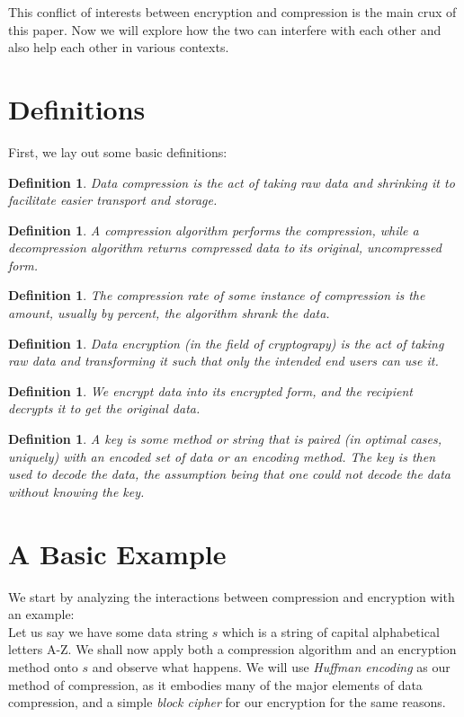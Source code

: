 \documentclass[11pt]{article}
\newtheorem{defn}[thm]{Definition}{\bfseries}{\rmfamily}
\begin{document}
This conflict of interests between encryption and compression is the main crux of this paper. 
Now we will explore how the two can interfere with each other and also help each other in 
various contexts.


\section{Definitions}\label{def-sect}
First, we lay out some basic definitions:
\begin{defn}
\emph{Data compression} is the act of taking raw data and shrinking it to facilitate easier transport and storage. 
\end{defn}
\begin{defn}
A \emph{compression algorithm} performs the compression, while a \emph{decompression algorithm} returns 
compressed data to its original, uncompressed form.
\end{defn}
\begin{defn}
The \emph{compression rate} of some instance of compression is the amount, usually by percent, the algorithm 
shrank the data. 
\end{defn}
\begin{defn}
\emph{Data encryption} (in the field of \emph{cryptograpy}) is the act of taking raw data and transforming it 
such that only the intended end users can use it.
\end{defn}
\begin{defn}
We \emph{encrypt} data into its encrypted form, and the recipient \emph{decrypts} it to get the original data. 
\end{defn}
\begin{defn}
A \emph{key} is some method or string that is paired (in optimal cases, uniquely) with an encoded set of data or 
an encoding method. The key is then used to decode the data, the assumption being that one could not decode the 
data without knowing the key.
\end{defn}

\section{A Basic Example}\label{simple-example-sect}
We start by analyzing the interactions between compression and encryption with an example:\\
Let us say we have some data string $s$ which is a string of capital alphabetical letters A-Z. 
We shall now apply both a compression algorithm and an encryption method onto $s$ and observe what happens.  
We will use \emph{Huffman encoding}\cite{huffman} as our method of compression, as it embodies many of the 
major elements of data compression, and a simple \emph{block cipher} for our encryption for the same reasons.
\end{document}
